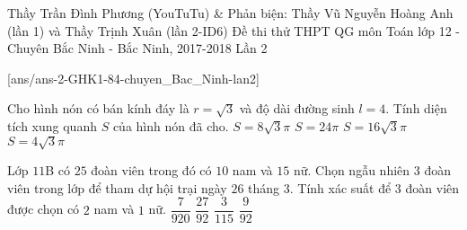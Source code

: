 \begin{name}
{Thầy Trần Đình Phương (YouTuTu) \& Phản biện: Thầy Vũ Nguyễn Hoàng Anh (lần 1) và Thầy Trịnh Xuân (lần 2-ID6)}
{Đề thi thử THPT QG môn Toán lớp 12 - Chuyên Bắc Ninh - Bắc Ninh, 2017-2018 Lần 2}
\end{name}
[ans/ans-2-GHK1-84-chuyen_Bac_Ninh-lan2]
\begin{ex}%
Cho hình nón có bán kính đáy là $r=\sqrt 3$ và độ dài đường sinh $l=4$. Tính diện tích xung quanh $S$ của hình nón đã cho.
\choice
{$S=8\sqrt3 \pi$}
{$S=24\pi$}
{$S=16\sqrt3\pi$}
{\True $S=4\sqrt3 \pi$}
\end{ex}
\begin{ex}%
Lớp $11$B có $25$ đoàn viên trong đó có $10$ nam và $15$ nữ. Chọn ngẫu nhiên $3$ đoàn viên trong lớp để tham dự hội trại ngày $26$ tháng $3$. Tính xác suất để $3$ đoàn viên được chọn có $2$ nam và $1$ nữ.
\choice
{$\dfrac{7}{920}$}
{\True $\dfrac{27}{92}$}
{$\dfrac{3}{115}$}
{$\dfrac{9}{92}$}
\end{ex}

